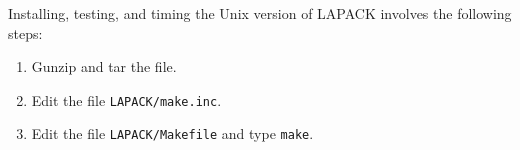 Installing, testing, and timing the Unix version of LAPACK
involves the following steps: 
\begin{enumerate}
\item Gunzip and tar the file.

\item Edit the file {\tt LAPACK/make.inc}.
 
\item Edit the file {\tt LAPACK/Makefile} and type {\tt make}.

%
%
%
%
%

\end{enumerate}
